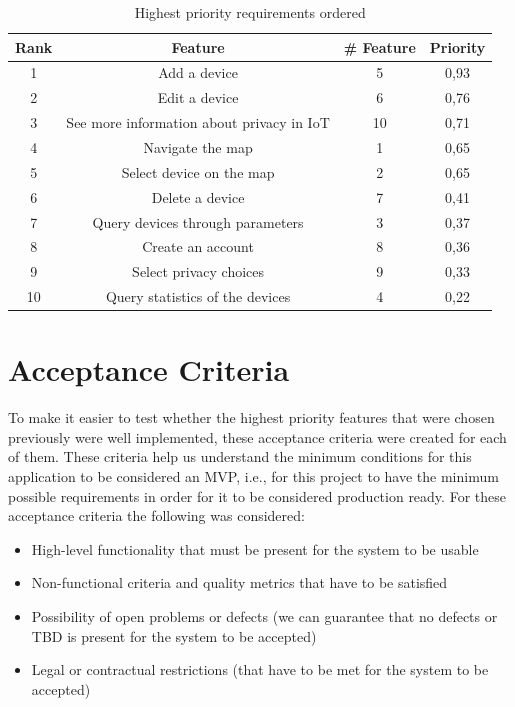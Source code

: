 \documentclass{scrreprt}
\begin{document}
\begin{table}[H]
    \centering
    \begin{tabular}{|c|c|c|c|}
        \hline
        \rowcolor{gray!50}
        \textbf{Rank} & \textbf{Feature} & \textbf{\# Feature} & \textbf{Priority} \\
        \hline
        1 & Add a device & 5 & 0,93 \\
        \hline
        2 & Edit a device & 6 & 0,76 \\
        \hline
        3 & See more information about privacy in IoT & 10 & 0,71 \\
        \hline
        4 & Navigate the map & 1 & 0,65 \\
        \hline
        5 & Select device on the map & 2 & 0,65 \\
        \hline
        6 & Delete a device & 7 & 0,41 \\
        \hline
        7 & Query devices through parameters & 3 & 0,37 \\
        \hline
        8 & Create an account & 8 & 0,36 \\
        \hline
        9 & Select privacy choices & 9 & 0,33 \\
        \hline
        10 & Query statistics of the devices & 4 & 0,22 \\
        \hline
    \end{tabular}
    \caption{Highest priority requirements ordered}
    \label{table:sorted requirements}
\end{table}

\section{Acceptance Criteria}

To make it easier to test whether the highest priority features that were chosen
previously were well implemented, these acceptance criteria were created for each
of them. These criteria help us understand the minimum conditions for this
application to be considered an MVP, i.e., for this project to have the minimum
possible requirements in order for it to be considered production ready.
\newline
For these acceptance criteria the following was considered:

\begin{itemize}
    \item High-level functionality that must be present for the system to be usable
    \item Non-functional criteria and quality metrics that have to be satisfied
    \item Possibility of open problems or defects (we can guarantee that no defects or TBD is present for the system to be accepted)
    \item Legal or contractual restrictions (that have to be met for the system to be accepted)
\end{itemize}
\end{document}
